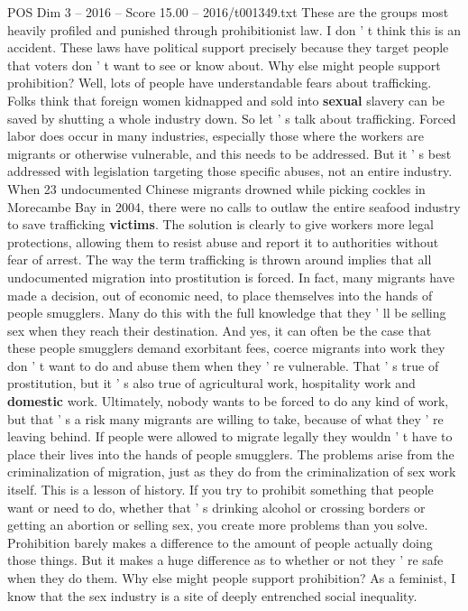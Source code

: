 \begin{textsample}{POS Dim 3 – 2016 – Score 15.00 – 2016/t001349.txt}
These are the groups most heavily profiled and punished through prohibitionist law.
I don ' t think this is an accident.
These laws have political support precisely because they target people that voters don ' t want to see or know about.
Why else might people support prohibition?
Well, lots of people have understandable fears about trafficking.
Folks think that foreign women kidnapped and sold into \textbf{sexual} slavery can be saved by shutting a whole industry down.
So let ' s talk about trafficking.
Forced labor does occur in many industries, especially those where the workers are migrants or otherwise vulnerable, and this needs to be addressed.
But it ' s best addressed with legislation targeting those specific abuses, not an entire industry.
When 23 undocumented Chinese migrants drowned while picking cockles in Morecambe Bay in 2004, there were no calls to outlaw the entire seafood industry to save trafficking \textbf{victims}.
The solution is clearly to give workers more legal protections, allowing them to resist abuse and report it to authorities without fear of arrest.
The way the term trafficking is thrown around implies that all undocumented migration into prostitution is forced.
In fact, many migrants have made a decision, out of economic need, to place themselves into the hands of people smugglers.
Many do this with the full knowledge that they ' ll be selling sex when they reach their destination.
And yes, it can often be the case that these people smugglers demand exorbitant fees, coerce migrants into work they don ' t want to do and abuse them when they ' re vulnerable.
That ' s true of prostitution, but it ' s also true of agricultural work, hospitality work and \textbf{domestic} work.
Ultimately, nobody wants to be forced to do any kind of work, but that ' s a risk many migrants are willing to take, because of what they ' re leaving behind.
If people were allowed to migrate legally they wouldn ' t have to place their lives into the hands of people smugglers.
The problems arise from the criminalization of migration, just as they do from the criminalization of sex work itself.
This is a lesson of history.
If you try to prohibit something that people want or need to do, whether that ' s drinking alcohol or crossing borders or getting an abortion or selling sex, you create more problems than you solve.
Prohibition barely makes a difference to the amount of people actually doing those things.
But it makes a huge difference as to whether or not they ' re safe when they do them.
Why else might people support prohibition?
As a feminist, I know that the sex industry is a site of deeply entrenched social inequality.

\end{textsample}
